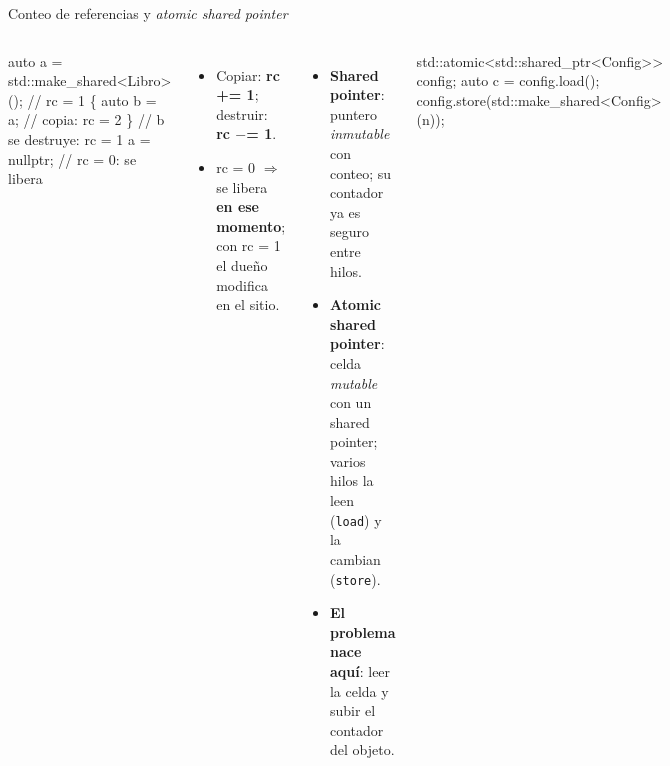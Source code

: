 \documentclass[aspectratio=169,11pt]{beamer}
\newcommand{\clave}[1]{\textcolor{acento}{\textbf{#1}}}
\begin{document}
\begin{frame}[fragile]{Conteo de referencias y \emph{atomic shared pointer}}
  \begin{columns}[T]
\begin{semiverbatim}\scriptsize
auto a = std::make_shared<Libro>(); // rc = 1
\{
    auto b = a;   // copia:          rc = 2
\}                 // b se destruye:  rc = 1
a = nullptr;      // rc = 0: se libera
\end{semiverbatim}
    \begin{itemize}\small
      \item Copiar: \textbf{rc += 1}; destruir: \textbf{rc $-$= 1}.
      \item rc = 0 $\Rightarrow$ se libera \textbf{en ese momento}; con rc = 1 el dueño modifica en el sitio.
    \end{itemize}
    \begin{itemize}\small
      \item \textbf{Shared pointer}: puntero \emph{inmutable} con conteo; su contador ya es seguro entre hilos.
      \item \textbf{Atomic shared pointer}: celda \emph{mutable} con un shared pointer; varios hilos la leen (\texttt{load}) y la cambian (\texttt{store}).
      \item \clave{El problema nace aquí}: leer la celda y subir el contador del objeto.
    \end{itemize}
\begin{semiverbatim}\scriptsize
std::atomic<std::shared_ptr<Config>> config;
auto c = config.load();
config.store(std::make_shared<Config>(n));
\end{semiverbatim}
  \end{columns}
\end{frame}
\end{document}
